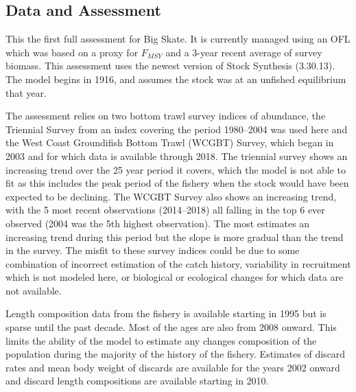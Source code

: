 \documentclass[12pt,]{article}
\begin{document}
\FloatBarrier

\newpage

\hypertarget{data-and-assessment}{%
\subsection*{Data and Assessment}\label{data-and-assessment}}

This the first full assessment for Big Skate. It is currently managed
using an OFL which was based on a proxy for \(F_{MSY}\) and a 3-year
recent average of survey biomass. This assessment uses the newest
version of Stock Synthesis (3.30.13). The model begins in 1916, and
assumes the stock was at an unfished equilibrium that year.

The assessment relies on two bottom trawl survey indices of abundance,
the Triennial Survey from an index covering the period 1980--2004 was
used here and the West Coast Groundifish Bottom Trawl (WCGBT) Survey,
which began in 2003 and for which data is available through 2018. The
triennial survey shows an increasing trend over the 25 year period it
covers, which the model is not able to fit as this includes the peak
period of the fishery when the stock would have been expected to be
declining. The WCGBT Survey also shows an increasing trend, with the 5
most recent observations (2014--2018) all falling in the top 6 ever
observed (2004 was the 5th highest observation). The most estimates an
increasing trend during this period but the slope is more gradual than
the trend in the survey. The misfit to these survey indices could be due
to some combination of incorrect estimation of the catch history,
variability in recruitment which is not modeled here, or biological or
ecological changes for which data are not available.

Length composition data from the fishery is available starting in 1995
but is sparse until the past decade. Most of the ages are also from 2008
onward. This limits the ability of the model to estimate any changes
composition of the population during the majority of the history of the
fishery. Estimates of discard rates and mean body weight of discards are
available for the years 2002 onward and discard length compositions are
available starting in 2010.
\end{document}
